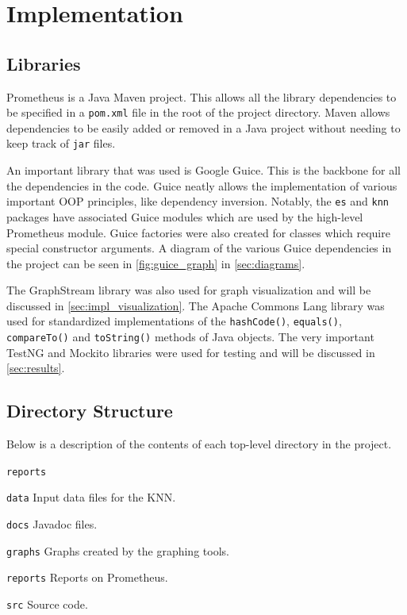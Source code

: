 \documentclass[titlepage,11pt]{article}
\newcommand{\code}[1]{\texttt{#1}}
\begin{document}
\section{Implementation}
\label{sec:implementation}

\subsection{Libraries}
Prometheus is a Java Maven project. This allows all the library dependencies to be specified in a \code{pom.xml} file in the root of the project directory. Maven allows dependencies to be easily added or removed in a Java project without needing to keep track of \code{jar} files.

An important library that was used is Google Guice. This is the backbone for all the dependencies in the code. Guice neatly allows the implementation of various important OOP principles, like dependency inversion. Notably, the \code{es} and \code{knn} packages have associated Guice modules which are used by the high-level Prometheus module. Guice factories were also created for classes which require special constructor arguments. A diagram of the various Guice dependencies in the project can be seen in \cref{fig:guice_graph} in \cref{sec:diagrams}.

The GraphStream library was also used for graph visualization and will be discussed in \cref{sec:impl_visualization}. The Apache Commons Lang library was used for standardized implementations of the \code{hashCode()}, \code{equals()}, \code{compareTo()} and \code{toString()} methods of Java objects. The very important TestNG and Mockito libraries were used for testing and will be discussed in \cref{sec:results}.

\subsection{Directory Structure}
Below is a description of the contents of each top-level directory in the project.

\begin{labeling}{\code{reports}}
	\item[\code{data}] Input data files for the KNN.
	\item[\code{docs}] Javadoc files.
	\item[\code{graphs}] Graphs created by the graphing tools.
	\item[\code{reports}] Reports on Prometheus.
	\item[\code{src}] Source code.
\end{labeling}
\end{document}
